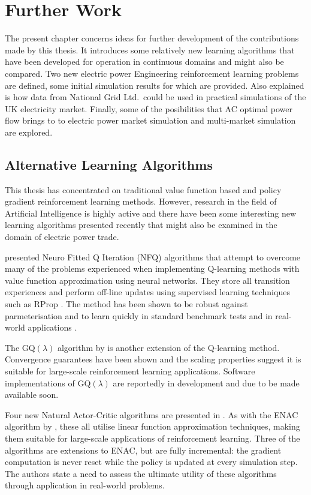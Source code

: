 \chapter{Further Work}
\label{sec:furtherwork}
The present chapter concerns ideas for further development of the contributions
made by this thesis.  It introduces some relatively new learning algorithms
that have been developed for operation in continuous domains and might
also be compared.  Two new electric
power Engineering reinforcement learning problems are defined, some initial
simulation results for which are provided.  Also explained is how data from
National Grid Ltd.~could be used in practical simulations of the UK
electricity market.  Finally, some of the posibilities that AC optimal power
flow brings to to electric power market simulation and multi-market simulation
are explored.

\section{Alternative Learning Algorithms}
This thesis has concentrated on traditional value function based and policy
gradient reinforcement learning methods.  However, research in the field of
Artificial Intelligence is highly active and there have been some interesting
new learning algorithms presented recently that might also be examined in the
domain of electric power trade.

 presented Neuro Fitted Q Iteration (NFQ) algorithms
that attempt to overcome many of the problems experienced when implementing
Q-learning methods with value function approximation using neural networks.
They store all transition experiences and perform off-line updates using
supervised learning techniques such as RProp \cite{riedmiller93}.  The method
has been shown to be robust against parmeterisation and to learn quickly in
standard benchmark tests and in real-world applications \cite{kietzmann09}.

The GQ$(\lambda)$ algorithm by  is another extension of the
Q-learning method.  Convergence guarantees have been shown and the scaling
properties suggest it is suitable for large-scale reinforcement learning
applications.  Software implementations of GQ$(\lambda)$ are reportedly in
development and due to be made available soon.

Four new Natural Actor-Critic algorithms are presented in .
As with the ENAC algorithm by , these all utilise linear
function approximation techniques, making them suitable for large-scale applications of
reinforcement learning.  Three of the algorithms are extensions to ENAC, but
are fully incremental: the gradient computation is never reset while the policy
is updated at every simulation step.  The authors state a need to assess the
ultimate utility of these algorithms through application in real-world
problems.

